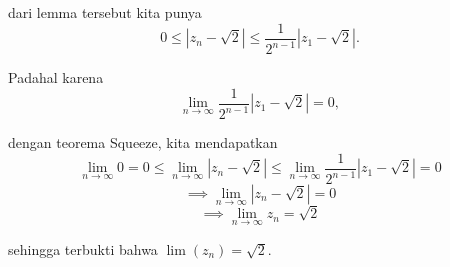 \documentclass{article}
\renewcommand{\qed}{\unskip\nobreak\quad\qedsymbol}%
\theoremstyle{indented}
\begin{document}
\begin{enumerate}
	dari lemma tersebut kita punya $$0 \le \left|z_{n} - \sqrt{2}\right| \le \frac{1}{2^{n-1}}\left|z_1-\sqrt{2}\right|.$$
	
	Padahal karena $$\lim\limits_{n \rightarrow \infty}\frac{1}{2^{n-1}}\left|z_1-\sqrt{2}\right| = 0,$$
	
	dengan teorema Squeeze, kita mendapatkan
	$$\lim\limits_{n \rightarrow \infty} 0 = 0\le \lim\limits_{n \rightarrow \infty}\left|z_n-\sqrt{2}\right| \le \lim\limits_{n \rightarrow \infty} \frac{1}{2^{n-1}}\left|z_1-\sqrt{2}\right| = 0$$
	$$\implies \lim\limits_{n \rightarrow \infty}\left|z_n-\sqrt{2}\right| = 0$$
	$$ \implies \lim\limits_{n \rightarrow \infty}z_n = \sqrt2$$
	
	sehingga terbukti bahwa $\lim (z_n) = \sqrt{2}$. \qed
	\end{enumerate}
	
	
\end{document}
